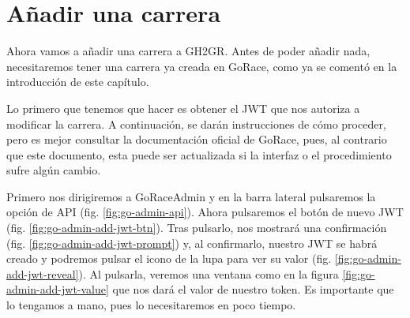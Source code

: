 \section{Añadir una carrera}
Ahora vamos a añadir una carrera a GH2GR. Antes de poder añadir nada, necesitaremos tener una carrera ya creada en GoRace, como ya se comentó en la introducción de este capítulo.

Lo primero que tenemos que hacer es obtener el \acrshort{JWT} que nos autoriza a modificar la carrera. A continuación, se darán instrucciones de cómo proceder, pero es mejor consultar la documentación oficial de GoRace, pues, al contrario que este documento, esta puede ser actualizada si la interfaz o el procedimiento sufre algún cambio.

Primero nos dirigiremos a GoRaceAdmin y en la barra lateral pulsaremos la opción de \acrshort{API} (fig. \ref{fig:go-admin-api}). Ahora pulsaremos el botón de nuevo \acrshort{JWT} (fig. \ref{fig:go-admin-add-jwt-btn}). Tras pulsarlo, nos mostrará una confirmación (fig. \ref{fig:go-admin-add-jwt-prompt}) y, al confirmarlo, nuestro \acrshort{JWT} se habrá creado y podremos pulsar el icono de la lupa para ver su valor (fig. \ref{fig:go-admin-add-jwt-reveal}). Al pulsarla, veremos una ventana como en la figura \ref{fig:go-admin-add-jwt-value} que nos dará el valor de nuestro token. Es importante que lo tengamos a mano, pues lo necesitaremos en poco tiempo.

